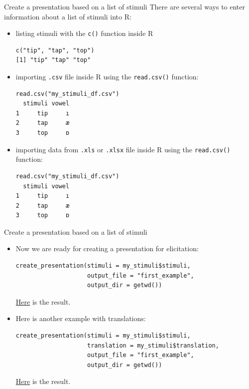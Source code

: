 \documentclass[13pt, t]{beamer}
\begin{document}
\begin{frame}[fragile]{Create a presentation based on a list of stimuli}
There are several ways to enter information about a list of stimuli into R:
\begin{itemize}
\item listing stimuli with the \texttt{c()}  function inside R
\begin{verbatim}
c("tip", "tap", "top")
[1] "tip" "tap" "top"
\end{verbatim}
\item importing \texttt{.csv} file inside R using the \texttt{read.csv()} function:
\begin{verbatim}
read.csv("my_stimuli_df.csv")
  stimuli vowel
1     tip     ı
2     tap     æ
3     top     ɒ
\end{verbatim}
\item importing data from \texttt{.xls} or \texttt{.xlsx} file inside R using the \texttt{read.csv()} function:
\begin{verbatim}
read.csv("my_stimuli_df.csv")
  stimuli vowel
1     tip     ı
2     tap     æ
3     top     ɒ
\end{verbatim}
\end{itemize}
\end{frame}

\begin{frame}[fragile]{Create a presentation based on a list of stimuli}
\begin{itemize}
\item Now we are ready for creating a presentation for elicitation:
\begin{verbatim}
create_presentation(stimuli = my_stimuli$stimuli,
                    output_file = "first_example",
                    output_dir = getwd()) 
\end{verbatim}
\href{https://agricolamz.github.io/phonfieldwork/first_example.html}{Here} is the result.
\item Here is another example with translations:
\begin{verbatim}
create_presentation(stimuli = my_stimuli$stimuli,
                    translation = my_stimuli$translation,
                    output_file = "first_example",
                    output_dir = getwd()) 
\end{verbatim}
\href{https://agricolamz.github.io/phonfieldwork/second_example.html}{Here} is the result.
\end{itemize}
\end{frame}
\end{document}
